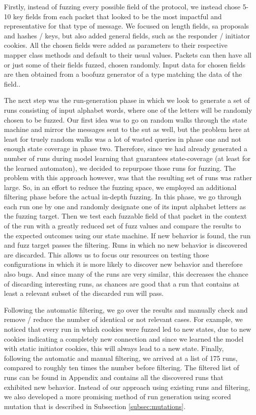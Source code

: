Firstly, instead of fuzzing every possible field of the protocol, we instead chose 5-10 key fields from each packet that looked to be the most impactful and representative for that type of message. We focused on length fields, \ac{sa} proposals and hashes / keys, but also added general fields, such as the responder / initiator cookies. All the chosen fields were added as parameters to their respective mapper class methods and default to their usual values. Packets can then have all or just some of their fields fuzzed, chosen randomly. Input data for chosen fields are then obtained from a boofuzz generator of a type matching the data of the field..

The next step was the run-generation phase in which we look to generate a set of runs consisting of input alphabet words, where one of the letters will be randomly chosen to be fuzzed. Our first idea was to go on random walks through the state machine and mirror the messages sent to the \ac{sut} as well, but the problem here at least for truely random walks was a lot of wasted queries in phase one and not enough state coverage in phase two. Therefore, since we had already generated a number of runs during model learning that guarantees state-coverage (at least for the learned automaton), we decided to repurpose those runs for fuzzing. The problem with this approach however, was that the resulting set of runs was rather large. So, in an effort to reduce the fuzzing space, we employed an additional filtering phase before the actual in-depth fuzzing. In this phase, we go through each run one by one and randomly designate one of its input alphabet letters as the fuzzing target. Then we test each fuzzable field of that packet in the context of the run with a greatly reduced set of fuzz values and compare the results to the expected outcomes using our state machine. If new behavior is found, the run and fuzz target passes the filtering. Runs in which no new behavior is discovered are discarded. This allows us to focus our resources on testing those configurations in which it is more likely to discover new behavior and therefore also bugs. And since many of the runs are very similar, this decreases the chance of discarding interesting runs, as chances are good that a run that contains at least a relevant subset of the discarded run will pass.

Following the automatic filtering, we go over the results and manually check and remove / reduce the number of identical or not relevant cases. For example, we noticed that every run in which cookies were fuzzed led to new states, due to new cookies indicating a completely new connection and since we learned the model with static initiator cookies, this will always lead to a new state. 
Finally, following the automatic and manual filtering, we arrived at a list of 175 runs, compared to roughly ten times the number before filtering. The filtered list of runs can be found in Appendix  and contains all the discovered runs that exhibited new behavior. Instead of our approach using existing runs and filtering, we also developed a more promising method of run generation using scored mutation that is described in Subsection \ref{subsec:mutations}.

